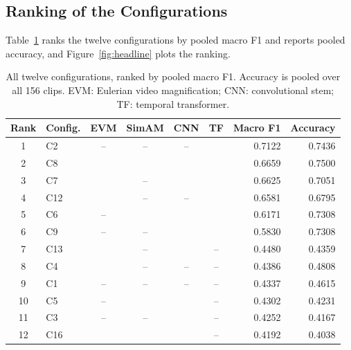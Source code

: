 \subsection{Ranking of the Configurations}
\label{sec:twelve-ranked}

Table~\ref{tab:twelve-ranked} ranks the twelve configurations by pooled macro F1 and reports pooled accuracy, and Figure~\ref{fig:headline} plots the ranking.

\begin{table}[htbp]
	\centering
	\footnotesize
	\begin{tabular}{c l c c c c r r}
		\hline
		\textbf{Rank} & \textbf{Config.} & \textbf{EVM} & \textbf{SimAM} & \textbf{CNN} & \textbf{TF} & \textbf{Macro F1} & \textbf{Accuracy} \\
		\hline
		1  & C2  & --         & --         & --         & \checkmark & 0.7122 & 0.7436 \\
		2  & C8  & \checkmark & \checkmark & \checkmark & \checkmark & 0.6659 & 0.7500 \\
		3  & C7  & \checkmark & --         & \checkmark & \checkmark & 0.6625 & 0.7051 \\
		4  & C12 & \checkmark & --         & --         & \checkmark & 0.6581 & 0.6795 \\
		5  & C6  & --         & \checkmark & \checkmark & \checkmark & 0.6171 & 0.7308 \\
		6  & C9  & --         & --         & \checkmark & \checkmark & 0.5830 & 0.7308 \\
		7  & C13 & \checkmark & --         & \checkmark & --         & 0.4480 & 0.4359 \\
		8  & C4  & \checkmark & --         & --         & --         & 0.4386 & 0.4808 \\
		9  & C1  & --         & --         & --         & --         & 0.4337 & 0.4615 \\
		10 & C5  & --         & \checkmark & \checkmark & --         & 0.4302 & 0.4231 \\
		11 & C3  & --         & --         & \checkmark & --         & 0.4252 & 0.4167 \\
		12 & C16 & \checkmark & \checkmark & \checkmark & --         & 0.4192 & 0.4038 \\
		\hline
	\end{tabular}
	\caption[All twelve configurations, ranked by pooled macro F1]{All twelve configurations, ranked by pooled macro F1. Accuracy is pooled over all 156 clips. EVM: Eulerian video magnification; CNN: convolutional stem; TF: temporal transformer.}
	\label{tab:twelve-ranked}
\end{table}

